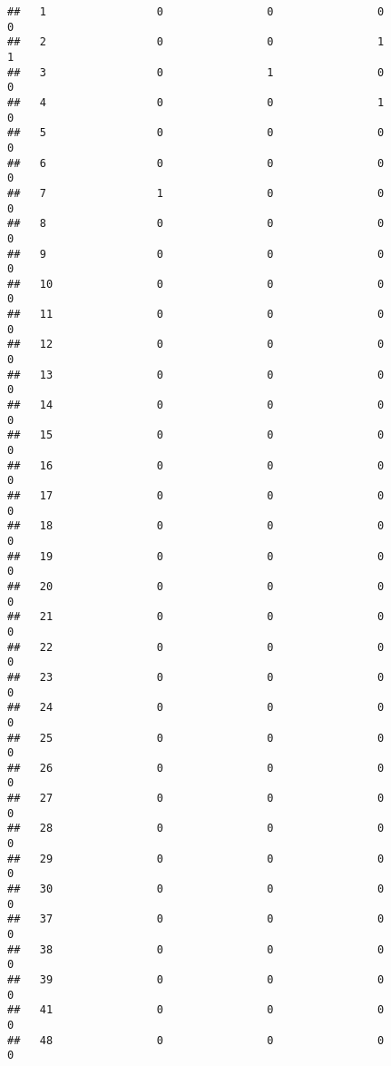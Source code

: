 \documentclass[]{article}
\begin{document}
\begin{verbatim}
##   1                 0                0                0                0
##   2                 0                0                1                1
##   3                 0                1                0                0
##   4                 0                0                1                0
##   5                 0                0                0                0
##   6                 0                0                0                0
##   7                 1                0                0                0
##   8                 0                0                0                0
##   9                 0                0                0                0
##   10                0                0                0                0
##   11                0                0                0                0
##   12                0                0                0                0
##   13                0                0                0                0
##   14                0                0                0                0
##   15                0                0                0                0
##   16                0                0                0                0
##   17                0                0                0                0
##   18                0                0                0                0
##   19                0                0                0                0
##   20                0                0                0                0
##   21                0                0                0                0
##   22                0                0                0                0
##   23                0                0                0                0
##   24                0                0                0                0
##   25                0                0                0                0
##   26                0                0                0                0
##   27                0                0                0                0
##   28                0                0                0                0
##   29                0                0                0                0
##   30                0                0                0                0
##   37                0                0                0                0
##   38                0                0                0                0
##   39                0                0                0                0
##   41                0                0                0                0
##   48                0                0                0                0

\end{verbatim}
\end{document}
